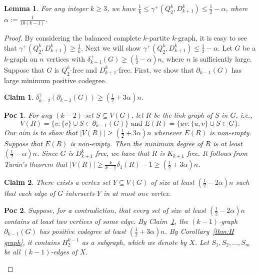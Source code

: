 \documentclass[10pt,a4paper]{amsart}
\newtheorem{lemma}{Lemma}
\newtheorem{cla}{Claim}
\newtheorem{poc}{Poc}
\begin{document}
\begin{lemma}\label{lem:main}
    For any integer $k\ge 3$, we have $\frac{1}{k}\le\gamma^+(Q_2^k,D_{k+1}^k) \le \frac{1}{2}-\alpha$, where $\alpha := \frac{1}{10(k-1)}$. 
\end{lemma}

\begin{proof}
    By considering the balanced complete $k$-partite $k$-graph, it is easy to see that $ \gamma^+(Q_2^k,D_{k+1}^k) \ge \frac{1}{k}$.
    Next we will show $\gamma^+(Q_2^k,D_{k+1}^k) \le \frac{1}{2}-\alpha$.
    Let $G$ be a $k$-graph on $n$ vertices with $\delta_{k-1}^+(G)\ge\left(\frac{1}{2}-\alpha \right)n$, where $n$ is sufficiently large.
    Suppose that $G$ is $Q_2^k$-free and $D_{k+1}^k$-free.
    First, we show that $\partial_{k-1}(G)$ has large minimum positive codegree.
    
    
    \begin{cla}\label{cl:k-2degree}
    $\delta_{k-2}^+(\partial_{k-1}(G))\ge\left(\frac{1}{2}+3\alpha\right)n$.
    \end{cla}
    \begin{poc}
    For any $(k-2)$-set $S\subseteq V(G)$, let $R$ be the link graph of $S$ in $G$, i.e., 
    \[
    \mbox{$V(R)=\{v:\{v\}\cup S\in\partial_{k-1}(G)\}$ \ \ and \ \ $E(R)=\{uv:\{u,v\}\cup S\in G\}$.}
    \] Our aim is to show that $|V(R)|\ge\left(\frac{1}{2}+3\alpha\right)n$ whenever $E(R)$ is non-empty. Suppose that $E(R)$ is non-empty. Then the minimum degree of $R$ is at least $\left(\frac{1}{2}-\alpha\right)n$. Since $G$ is $D_{k+1}^k$-free, we have that $R$ is $K_{k+1}$-free. It follows from Tur\'an's theorem that $|V(R)|\ge \frac{k}{k-1}\delta_1(R)-1\ge \left(\frac{1}{2}+3\alpha\right)n$.
    \end{poc}
    
    \begin{cla}\label{cl:IndepY}
    There exists a vertex set $Y\subseteq V(G)$ of size at least $\left(\frac{1}{2}-2\alpha\right)n$ such that each edge of $G$ intersects $Y$ in at most one vertex.
    \end{cla}
    \begin{poc}
    Suppose, for a contradiction, that every set of size at least $\left(\frac{1}{2}-2\alpha\right)n$ contains at least two vertices of some edge.  By Claim~\ref{cl:k-2degree}, the $(k-1)$-graph $\partial_{k-1}(G)$ has positive codegree at least $\left(\frac{1}{2}+3\alpha\right)n$. By Corollary~\ref{thm:H graph}, it contains $H_2^{k-1}$ as a subgraph, which we denote by $X$. Let $S_1,S_2,\dots, S_m$ be all $(k-1)$-edges of $X$.
    

\end{poc}
\end{proof}
\end{document}
